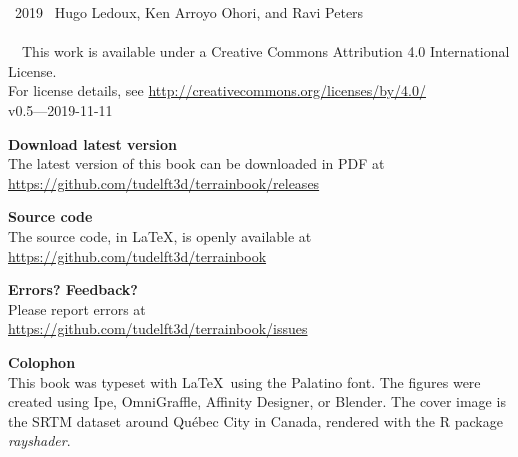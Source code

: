 
\clearpage
\thispagestyle{empty}
\null%
\vfill


\textcopyright\ 2019 \, Hugo Ledoux, Ken Arroyo Ohori, and Ravi Peters
\\ \\
\ccLogo\ \ccAttribution\ This work is available under a Creative Commons Attribution 4.0 International License.
\\For license details, see \url{http://creativecommons.org/licenses/by/4.0/}
\\


v0.5---2019-11-11


\textbf{Download latest version} \\
The latest version of this book can be downloaded in PDF at\\ 
\url{https://github.com/tudelft3d/terrainbook/releases}


\textbf{Source code} \\
The source code, in \LaTeX, is openly available at\\
\url{https://github.com/tudelft3d/terrainbook}


\textbf{Errors? Feedback?} \\
Please report errors at\\
\url{https://github.com/tudelft3d/terrainbook/issues}

\textbf{Colophon} \\
This book was typeset with \LaTeX\ using the Palatino font.
The figures were created using Ipe, OmniGraffle, Affinity Designer, or Blender.
The cover image is the SRTM dataset around Québec City in Canada, rendered with the R package \emph{rayshader}.
